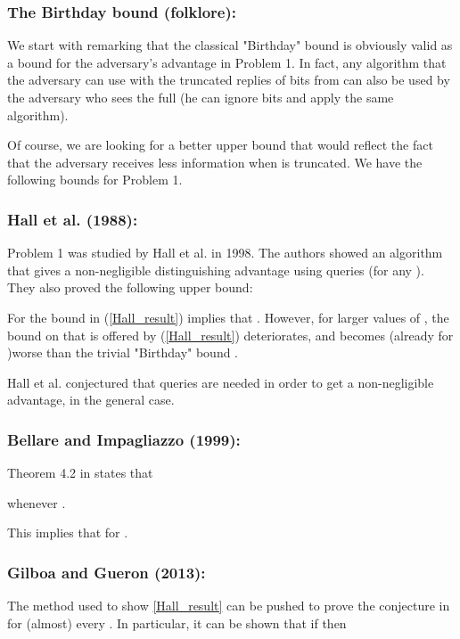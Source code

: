 \documentclass{llncs}
\numberwithin{equation}{section}
\numberwithin{lemma}{section}
\numberwithin{proposition}{section}
\begin{document}
\subsubsection{The Birthday bound (folklore):}
We start with remarking that the classical "Birthday" bound  is obviously valid as a bound for the adversary's advantage in Problem 1. 
In fact, any algorithm that the adversary can use with the truncated replies of  bits from  can also be used by the adversary who sees the full  (he can ignore  bits and apply the same algorithm). \newline

Of course, we are looking for a better upper bound that would reflect the fact that the adversary receives less information when  is truncated. 
We have the following bounds for Problem 1.

\subsubsection{Hall et al. \cite{Hall} (1988):}
Problem 1 was studied by Hall et al. \cite{Hall} in 1998. The authors showed an algorithm that gives a non-negligible distinguishing advantage using  queries (for any ). They also proved the following upper bound:


For  the bound in (\ref{Hall_result}) implies that . However, for larger values of , the bound on that is offered by (\ref{Hall_result}) deteriorates, and becomes (already for )worse than the trivial "Birthday" bound . 

Hall et al. \cite{Hall} conjectured that  queries are needed in order to get a non-negligible advantage, in the general case. 

\subsubsection{Bellare and Impagliazzo \cite{BI} (1999):}

Theorem 4.2  in \cite{BI} states that 

whenever . 

This implies that  for .



\subsubsection{Gilboa and Gueron \cite{GG} (2013):}

The method used to show \eqref{Hall_result} can be pushed to prove the conjecture in \cite{Hall} for (almost) every . 
In particular, it can be shown that if  then
\end{document}
